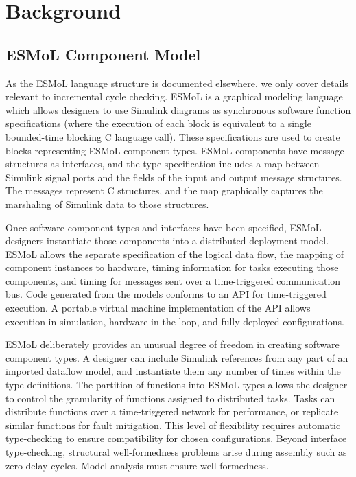 \section{Background}
\label{section:background}

\subsection{ESMoL Component Model}

As the ESMoL language structure is documented elsewhere\cite{modeling:esmol_tr}, we only cover details relevant to incremental cycle checking.  ESMoL is a graphical
modeling language which allows designers to use Simulink diagrams as 
synchronous software function specifications (where the execution of each 
block is equivalent to a single bounded-time blocking C language call).  These
specifications are used to create blocks representing ESMoL component types.   
ESMoL components have message structures as interfaces, and the type
specification includes a map between Simulink signal ports and the 
fields of the input and output message structures.  The messages represent C structures, and the map graphically captures the marshaling of Simulink data to those structures.

Once software component types and interfaces have been specified, ESMoL 
designers instantiate those components into a distributed 
deployment model.  ESMoL allows the separate specification of the logical
data flow, the mapping of component instances to hardware, timing
information for tasks executing those components, and timing for messages sent
over a time-triggered communication bus.  Code generated from the models
conforms to an API for time-triggered execution.  A portable virtual machine
implementation of the API allows execution in simulation, hardware-in-the-loop,
and fully deployed configurations\cite{modeling:truetime}.

ESMoL deliberately provides an unusual degree of freedom in creating 
software component types.  A designer can include Simulink references from
any part of an imported dataflow model, and instantiate them any number of 
times within the type definitions. The partition of functions into ESMoL types 
allows the designer to control the granularity of functions assigned to 
distributed tasks.  Tasks can distribute functions over a time-triggered 
network for performance, or replicate similar functions for fault mitigation.  
This level of flexibility requires automatic type-checking to ensure 
compatibility for chosen configurations.  Beyond interface type-checking, 
structural well-formedness problems arise during assembly such as zero-delay 
cycles.   Model analysis must ensure well-formedness.

